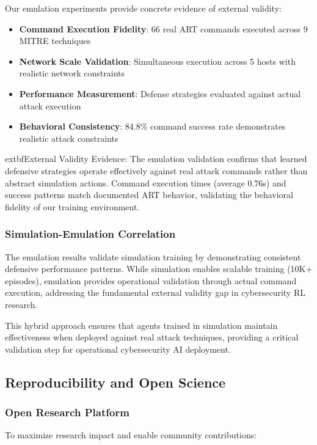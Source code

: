\documentclass[12pt,oneside]{article}
\begin{document}
Our emulation experiments provide concrete evidence of external validity:

\begin{itemize}
    \item \textbf{Command Execution Fidelity}: 66 real ART commands executed across 9 MITRE techniques
    \item \textbf{Network Scale Validation}: Simultaneous execution across 5 hosts with realistic network constraints
    \item \textbf{Performance Measurement}: Defense strategies evaluated against actual attack execution
    \item \textbf{Behavioral Consistency}: 84.8\% command success rate demonstrates realistic attack constraints
\end{itemize}

	extbf{External Validity Evidence}: The emulation validation confirms that learned defensive strategies operate effectively against real attack commands rather than abstract simulation actions. Command execution times (average 0.76s) and success patterns match documented ART behavior, validating the behavioral fidelity of our training environment.

\subsubsection{Simulation-Emulation Correlation}

The emulation results validate simulation training by demonstrating consistent defensive performance patterns. While simulation enables scalable training (10K+ episodes), emulation provides operational validation through actual command execution, addressing the fundamental external validity gap in cybersecurity RL research.

This hybrid approach ensures that agents trained in simulation maintain effectiveness when deployed against real attack techniques, providing a critical validation step for operational cybersecurity AI deployment.

\subsection{Reproducibility and Open Science}

\subsubsection{Open Research Platform}
To maximize research impact and enable community contributions:
\end{document}
